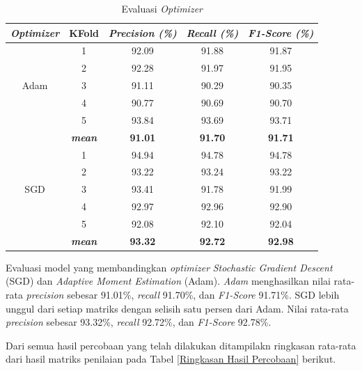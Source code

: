         \begin{table}[H]
        \centering
        \caption{Evaluasi \textit{Optimizer}}
        \begin{tabular}{ccccc}
            \toprule
            \textbf{\textit{Optimizer}} & \multicolumn{1}{c}{\textbf{KFold}} & \textbf{\textit{Precision (\%) } } & \textbf{\textit{Recall (\%)}} & \textbf{\textit{F1-Score (\%)}}\\
        
            \midrule
            \multirow{5}{*}{Adam} 
            & 1 & 92.09 & 91.88 & 91.87 \\
            & 2 & 92.28 & 91.97 & 91.95 \\
            & 3 & 91.11 & 90.29 & 90.35 \\
            & 4 & 90.77 & 90.69 & 90.70 \\
            & 5 & 93.84 & 93.69 & 93.71 \\ 
            & \textit{\textbf{mean}}& \textbf{91.01} & \textbf{91.70} &\textbf{91.71} \\ 
            \hline

    
            \multirow{5}{*}{SGD}
            & 1 & 94.94 & 94.78 & 94.78 \\
            & 2 & 93.22 & 93.24 & 93.22 \\
            & 3 & 93.41 & 91.78 & 91.99 \\
            & 4 & 92.97 & 92.96 & 92.90 \\
            & 5 & 92.08 & 92.10 & 92.04  \\
            & \textit{\textbf{mean}}& \textbf{93.32} & \textbf{92.72} &\textbf{92.98} \\ 
    

            \bottomrule
        \end{tabular}
        \label{Evaluasi Optimizer}
    \end{table}

    Evaluasi model yang membandingkan \textit{optimizer} \textit{Stochastic Gradient Descent} (SGD) dan \textit{Adaptive Moment Estimation} (Adam).  \textit{Adam} menghasilkan nilai rata-rata \textit{precision} sebesar 91.01\%, \textit{recall} 91.70\%, dan\textit{ F1-Score} 91.71\%. SGD lebih unggul dari setiap matriks dengan selisih satu persen dari Adam. Nilai rata-rata \textit{precision} sebesar 93.32\%, \textit{recall} 92.72\%, dan\textit{ F1-Score} 92.78\%.

    


    Dari semua hasil percobaan yang telah dilakukan ditampilakn ringkasan rata-rata dari hasil matriks penilaian pada Tabel \ref{Ringkasan Hasil Percobaan} berikut.


